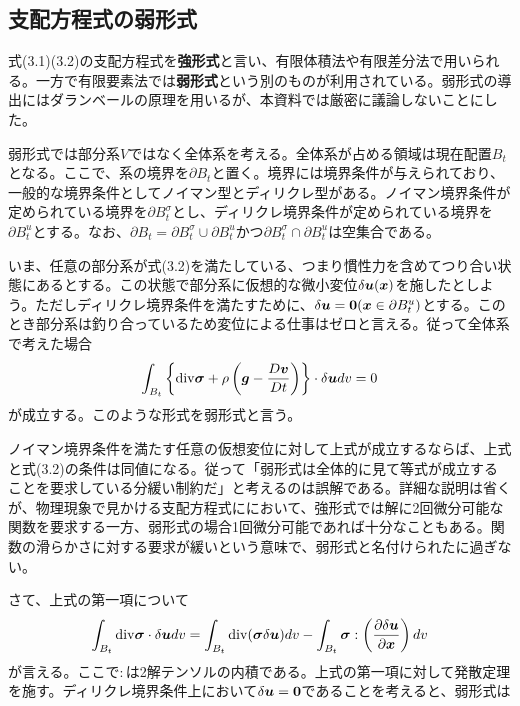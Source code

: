 \documentclass[dvipdfmx, 9pt, a4paper]{jsarticle}
\numberwithin{equation}{section}
\newcommand{\bm}[1]{{\mbox{\boldmath $#1$}}}
\begin{document}
\subsection{支配方程式の弱形式}
式(3.1)(3.2)の支配方程式を{\bf 強形式}と言い、有限体積法や有限差分法で用いられる。一方で有限要素法では{\bf 弱形式}という別のものが利用されている。弱形式の導出にはダランベールの原理を用いるが、本資料では厳密に議論しないことにした。\par
弱形式では部分系$V$ではなく全体系を考える。全体系が占める領域は現在配置$B_t$となる。ここで、系の境界を$\partial B_t$と置く。境界には境界条件が与えられており、一般的な境界条件としてノイマン型とディリクレ型がある。ノイマン境界条件が定められている境界を$\partial B_t^\sigma$とし、ディリクレ境界条件が定められている境界を$\partial B_t^u$とする。なお、$\partial B_t = \partial B_t^\sigma \cup \partial B_t^u$かつ$\partial B_t^\sigma \cap \partial B_t^u$は空集合である。\par
いま、任意の部分系が式(3.2)を満たしている、つまり慣性力を含めてつり合い状態にあるとする。この状態で部分系に仮想的な微小変位$\delta \bm u(\bm x)$を施したとしよう。ただしディリクレ境界条件を満たすために、$\delta \bm u=\bm 0 (\bm x \in \partial B_t^u)$とする。このとき部分系は釣り合っているため変位による仕事はゼロと言える。従って全体系で考えた場合
\begin{equation}
\int_{B_t}\left\{{\rm div}\bm \sigma + \rho \left(\bm g - \frac{D\bm v}{Dt}\right)\right\} \cdot \delta \bm udv=0 \notag
\end{equation}
が成立する。このような形式を弱形式と言う。\par
ノイマン境界条件を満たす任意の仮想変位に対して上式が成立するならば、上式と式(3.2)の条件は同値になる。従って「弱形式は全体的に見て等式が成立することを要求している分緩い制約だ」と考えるのは誤解である。詳細な説明は省くが、物理現象で見かける支配方程式ににおいて、強形式では解に2回微分可能な関数を要求する一方、弱形式の場合1回微分可能であれば十分なこともある。関数の滑らかさに対する要求が緩いという意味で、弱形式と名付けられたに過ぎない。\par
さて、上式の第一項について
\begin{equation}
\int_{B_t}{\rm div}\bm \sigma \cdot \delta \bm udv=\int_{B_t}{\rm div}(\bm \sigma\delta \bm u)dv - \int_{B_t}\bm \sigma:\left(\frac{\partial \delta \bm u}{\partial \bm x}\right)dv \notag
\end{equation}
が言える。ここで$:$は2解テンソルの内積である。上式の第一項に対して発散定理を施す。ディリクレ境界条件上において$\delta \bm u=\bm 0$であることを考えると、弱形式は
\end{document}
